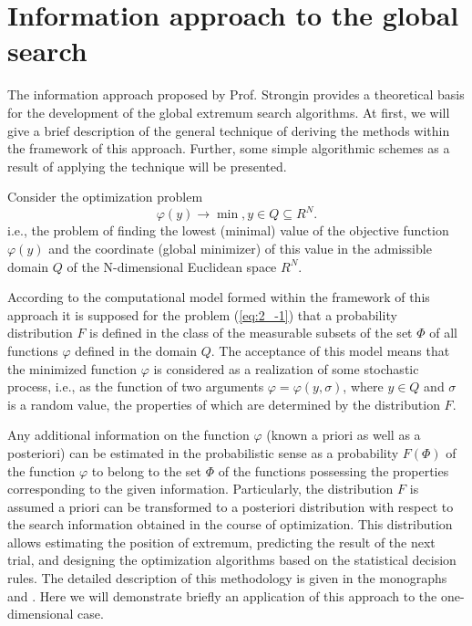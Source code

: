 \section{Information approach to the global search}
\label{sec:2_1}
The information approach proposed by Prof. Strongin \cite{2_StrMonRus, 2_Str1989, 2_StrSergMon2000} provides a theoretical basis for the development of the global extremum search algorithms. At first, we will give a brief description of the general technique of deriving the methods within the framework of this approach. Further, some simple algorithmic schemes as a result of applying the technique will be presented. 

Consider the optimization problem 
\begin{equation}
\label{eq:2_-1}
\varphi(y)\rightarrow\min, y \in Q\subseteq R^N.
\end{equation}
i.e., the problem of finding the lowest (minimal) value of the objective function $\varphi(y)$ and the coordinate (global minimizer) of this value in the admissible domain $Q$ of the N-dimensional Euclidean space $R^N$.

According to the computational model formed within the framework of this approach it is supposed for the problem (\ref{eq:2_-1}) that a probability distribution $F$ is defined in the class of the measurable subsets of the set $\Phi$ of all functions $\varphi$ defined in the domain $Q$. The acceptance of this model means that the minimized function $\varphi$ is considered as a realization of some stochastic process, i.e., as the function of two arguments $\varphi=\varphi(y,\sigma)$, where $y\in Q$ and $\sigma$ is a random value, the properties of which are determined by the distribution $F$. 

Any additional information on the function $\varphi$ (known a priori as well as a posteriori) can be estimated in the probabilistic sense as a probability $F(\Phi\acute{})$  of the function $\varphi$ to belong to the set  $\Phi\acute{}$ of the functions possessing the properties corresponding to the given information. Particularly, the distribution $F$ is assumed a priori can be transformed to a posteriori distribution   with respect to the search information obtained in the course of optimization. This distribution allows estimating the position of extremum, predicting the result of the next trial, and designing the optimization algorithms based on the statistical decision rules. The detailed description of this methodology is given in the monographs ~\cite{2_StrMonRus} and \cite{2_StrSergMon2000}. Here we will demonstrate briefly an application of this approach to the one-dimensional case. 

